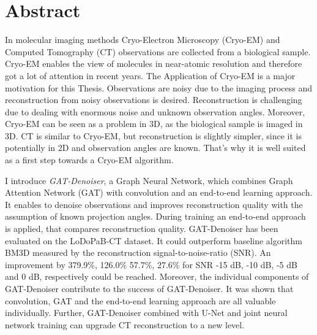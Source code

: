 \chapter{Abstract}


In molecular imaging methods Cryo-Electron Microscopy (Cryo-EM) and Computed Tomography (CT)
observations are collected from a biological sample. 
Cryo-EM enables the view of molecules in near-atomic resolution and therefore got a lot of attention in recent years.
The Application of Cryo-EM is a major motivation for this Thesis. 
Observations are noisy due to the imaging process and reconstruction from noisy observations is desired.
Reconstruction is challenging due to dealing with enormous noise and unknown observation angles.
Moreover, Cryo-EM can be seen as a problem in 3D, as the biological sample is imaged in 3D.
CT is similar to Cryo-EM, but reconstruction is slightly simpler, since it is potentially in 2D and 
observation angles are known.
That's why it is well suited as a first step towards a Cryo-EM algorithm.

I introduce \textit{GAT-Denoiser}, a Graph Neural Network, which combines Graph Attention Network (GAT) with convolution 
and an end-to-end learning approach. 
It enables to denoise observations and improves reconstruction quality with the assumption of known projection angles.
During training an end-to-end approach is applied, that compares reconstruction quality.
GAT-Denoiser has been evaluated on the LoDoPaB-CT dataset.
It could outperform baseline algorithm BM3D measured by the reconstruction
signal-to-noise-ratio (SNR). An improvement by 379.9\%, 126.0\% 57.7\%, 27.6\% for SNR -15 dB, -10 dB, -5 dB and 0 dB, respectively
could be reached.
Moreover, the individual components of GAT-Denoiser contribute to the success of GAT-Denoiser.
It was shown that convolution, GAT and the end-to-end learning approach are all valuable individually.
Further, GAT-Denoiser combined with U-Net and joint neural network training can upgrade CT reconstruction to a new level. 


